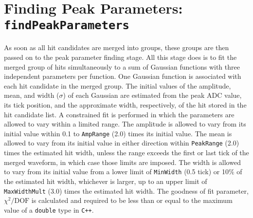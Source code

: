 \documentclass[a4paper]{article}
\begin{document}
\section{Finding Peak Parameters: \texttt{findPeakParameters}}
As soon as all hit candidates are merged into groups, these groups are then passed on to the peak parameter finding stage.  All this stage does is to fit the merged group of hits simultaneously to a sum of Gaussian functions with three independent parameters per function.  One Gaussian function is associated with each hit candidate in the merged group.  The initial values of the amplitude, mean, and width ($\sigma$) of each Gaussian are estimated from the peak ADC value, its tick position, and the approximate width, respectively, of the hit stored in the hit candidate list.  A constrained fit is performed in which the parameters are allowed to vary within a limited range.  The amplitude is allowed to vary from its initial value within 0.1 to \texttt{AmpRange} (2.0) times its initial value.  The mean is allowed to vary from its initial value in either direction within \texttt{PeakRange} (2.0) times the estimated hit width, unless the range exceeds the first or last tick of the merged waveform, in which case those limits are imposed.  The width is allowed to vary from its initial value from a lower limit of \texttt{MinWidth} (0.5 tick) or 10$\%$ of the estimated hit width, whichever is larger, up to an upper limit of \texttt{MaxWidthMult} (3.0) times the estimated hit width.  The goodness of fit parameter,  $\chi^2/\text{DOF}$ is calculated and required to be less than or equal to the maximum value of a \texttt{double} type in \texttt{C++}.
\end{document}
